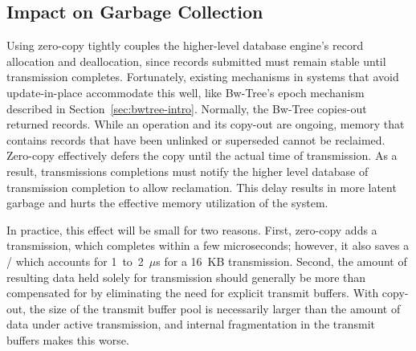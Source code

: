 \subsection{Impact on Garbage Collection}

Using zero-copy tightly couples the higher-level database engine's record
allocation and deallocation, since records submitted must remain stable until
transmission completes. Fortunately, existing mechanisms in systems that avoid
update-in-place accommodate this well, like Bw-Tree's epoch mechanism described
in Section~\ref{sec:bwtree-intro}. Normally, the Bw-Tree copies-out returned records.
While an operation and its copy-out are ongoing, memory that contains records
that have been unlinked or superseded cannot be reclaimed. Zero-copy
effectively defers the copy until the actual time of transmission. As a result,
transmissions completions must notify the higher level database of transmission
completion to allow reclamation. This delay results in more latent garbage and
hurts the effective memory utilization of the system.

In practice, this effect will be small for two reasons. First, zero-copy adds a
transmission, which completes within a few microseconds; however, it also saves a
\memcpy/  which accounts for 1~to~2~$\mu$s for a 16~KB transmission. Second, the
amount of resulting data held solely for transmission should generally be
more than compensated for by eliminating the need for explicit transmit
buffers. With copy-out, the size of the transmit buffer pool is necessarily
larger than the amount of data under active transmission, and internal
fragmentation in the transmit buffers makes this worse.


